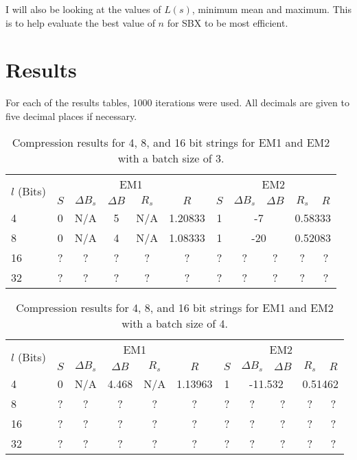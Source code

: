\documentclass[10pt]{article}
\begin{document}
I will also be looking at the values of $L(s)$, minimum mean and maximum. This is to help evaluate the best value of $n$ for SBX to be most efficient.

\section{Results}\label{sec:results}

For each of the results tables, 1000 iterations were used. All decimals are given to five decimal places if necessary.

\begin{table}[ht]
    \centering
    \begin{tabular}{l|c c c c c|c c c c c}
        \hline
        \multirow{2}{*}{$l$ (Bits)} & \multicolumn{5}{c|}{EM1} & \multicolumn{5}{c}{EM2} \\
         & $S$ & $\Delta B_s$ & $\Delta B$ & $R_s$ & $R$ & $S$ & $\Delta B_s$ & $\Delta B$ & $R_s$ & $R$ \\
        \Xhline{3\arrayrulewidth}
        4 & 0 & N/A & 5 & N/A & 1.20833 & 1 & \multicolumn{2}{c}{-7} & \multicolumn{2}{c}{0.58333} \\
        8 & 0 & N/A & 4 & N/A & 1.08333 & 1 & \multicolumn{2}{c}{-20} & \multicolumn{2}{c}{0.52083} \\
        16 & ? & ? & ? & ? & ? & ? & ? & ? & ? & ? \\
        32 & ? & ? & ? & ? & ? & ? & ? & ? & ? & ? \\
        \hline
    \end{tabular}
    \caption{Compression results for 4, 8, and 16 bit strings for EM1 and EM2 with a batch size of 3.}
    \label{tab:resB3}
\end{table}

\begin{table}[ht]
    \centering
    \begin{tabular}{l|c c c c c|c c c c c}
        \hline
        \multirow{2}{*}{$l$ (Bits)} & \multicolumn{5}{c|}{EM1} & \multicolumn{5}{c}{EM2} \\
         & $S$ & $\Delta B_s$ & $\Delta B$ & $R_s$ & $R$ & $S$ & $\Delta B_s$ & $\Delta B$ & $R_s$ & $R$ \\
        \Xhline{3\arrayrulewidth}
        4 & 0 & N/A & 4.468 & N/A & 1.13963 & 1 & \multicolumn{2}{c}{-11.532} & \multicolumn{2}{c}{0.51462} \\
        8 & ? & ? & ? & ? & ? & ? & ? & ? & ? & ? \\
        16 & ? & ? & ? & ? & ? & ? & ? & ? & ? & ? \\
        32 & ? & ? & ? & ? & ? & ? & ? & ? & ? & ? \\
        \hline
    \end{tabular}
    \caption{Compression results for 4, 8, and 16 bit strings for EM1 and EM2 with a batch size of 4.}
    \label{tab:resB4}
\end{table}
\end{document}
